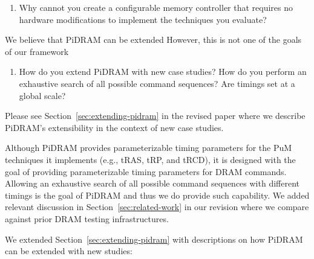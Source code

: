 \newpage
\begin{center}
    {\Large {}}
\end{center}

\bigbreak
\begin{tcolorbox}
    \begin{enumerate}[label=R5/\arabic*]
        \item \label{q:r5q1} Why cannot you create a configurable memory controller that requires no hardware modifications to implement the techniques you evaluate?
    \end{enumerate}
\end{tcolorbox} 

We believe that PiDRAM can be extended  However, this is not one of the goals of our framework 

\bigbreak
\begin{tcolorbox}
    \begin{enumerate}[label=R5/\arabic*]
        \addtocounter{enumi}{1}
        \item \label{q:r5q2} How do you extend PiDRAM with new case studies? How do you perform an exhaustive search of all possible command sequences? Are timings set at a global scale?  
    \end{enumerate}
\end{tcolorbox} 

Please see Section~\ref{sec:extending-pidram} in the revised paper where we describe PiDRAM’s extensibility in the context of new case studies.

Although PiDRAM provides parameterizable timing parameters for the PuM techniques it implements (e.g., tRAS, tRP, and tRCD), it is  designed with the goal of providing parameterizable timing parameters for  DRAM commands. Allowing an exhaustive search of all possible command sequences with different timings is  the goal of PiDRAM and thus we do  provide such capability. We added relevant discussion in Section~\ref{sec:related-work} in our revision where we compare against prior DRAM testing infrastructures.

We extended Section~\ref{sec:extending-pidram} with descriptions on how PiDRAM can be extended with new studies:

